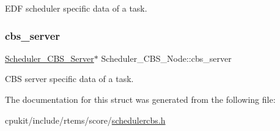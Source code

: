E\+DF scheduler specific data of a task. \mbox{\label{structScheduler__CBS__Node_adbcbec63492eb9cd70921b1be70e4ea6}} 
\subsubsection{\texorpdfstring{cbs\_server}{cbs\_server}}
{\footnotesize\ttfamily \mbox{\hyperlink{structScheduler__CBS__Server}{Scheduler\+\_\+\+C\+B\+S\+\_\+\+Server}}$\ast$ Scheduler\+\_\+\+C\+B\+S\+\_\+\+Node\+::cbs\+\_\+server}

C\+BS server specific data of a task. 

The documentation for this struct was generated from the following file\+:\begin{DoxyCompactItemize}
\item 
cpukit/include/rtems/score/\mbox{\hyperlink{schedulercbs_8h}{schedulercbs.\+h}}\end{DoxyCompactItemize}
